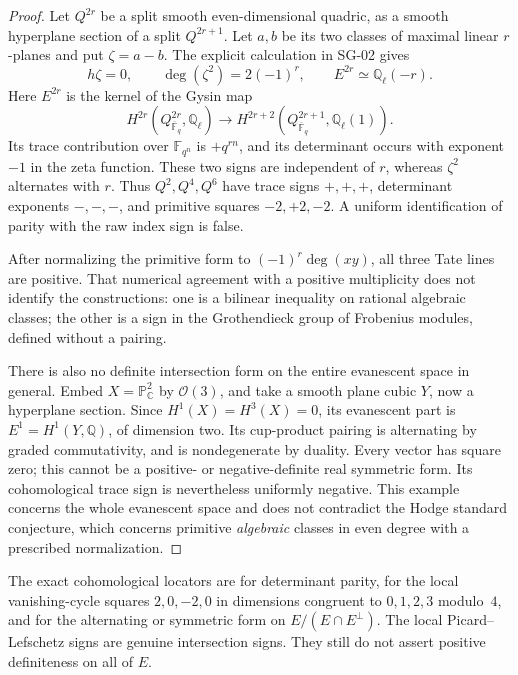 \begin{proof}
Let $Q^{2r}$ be a split smooth even-dimensional quadric, as a smooth hyperplane section of a split $Q^{2r+1}$. Let $a,b$ be its two classes of maximal linear $r$-planes and put $\zeta=a-b$. The explicit calculation in SG-02 gives
\[
 h\zeta=0,\qquad \deg(\zeta^2)=2(-1)^r,
 \qquad E^{2r}\simeq\mathbb Q_\ell(-r).
\]
Here $E^{2r}$ is the kernel of the Gysin map
\[
 H^{2r}(Q^{2r}_{\overline{\mathbb F}_q},\mathbb Q_\ell)
 \longrightarrow H^{2r+2}(Q^{2r+1}_{\overline{\mathbb F}_q},\mathbb Q_\ell(1)).
\]
Its trace contribution over $\mathbb F_{q^n}$ is $+q^{rn}$, and its determinant occurs with exponent $-1$ in the zeta function. These two signs are independent of $r$, whereas $\zeta^2$ alternates with $r$. Thus $Q^2,Q^4,Q^6$ have trace signs $+,+,+$, determinant exponents $-,-,-$, and primitive squares $-2,+2,-2$. A uniform identification of parity with the raw index sign is false.

After normalizing the primitive form to $(-1)^r\deg(xy)$, all three Tate lines are positive. That numerical agreement with a positive multiplicity does not identify the constructions: one is a bilinear inequality on rational algebraic classes; the other is a sign in the Grothendieck group of Frobenius modules, defined without a pairing.

There is also no definite intersection form on the entire evanescent space in general. Embed $X=\mathbb P^2_{\mathbb C}$ by $\mathcal O(3)$, and take a smooth plane cubic $Y$, now a hyperplane section. Since $H^1(X)=H^3(X)=0$, its evanescent part is $E^1=H^1(Y,\mathbb Q)$, of dimension two. Its cup-product pairing is alternating by graded commutativity, and is nondegenerate by duality. Every vector has square zero; this cannot be a positive- or negative-definite real symmetric form. Its cohomological trace sign is nevertheless uniformly negative. This example concerns the whole evanescent space and does not contradict the Hodge standard conjecture, which concerns primitive \emph{algebraic} classes in even degree with a prescribed normalization.
\end{proof}

The exact cohomological locators are \cite[eq.~(1.5.4), p.~276]{WeilI} for determinant parity, \cite[\S4.1, p.~287]{WeilI} for the local vanishing-cycle squares $2,0,-2,0$ in dimensions congruent to $0,1,2,3$ modulo~$4$, and \cite[\S5.9, p.~293]{WeilI} for the alternating or symmetric form on $E/(E\cap E^\perp)$. The local Picard--Lefschetz signs are genuine intersection signs. They still do not assert positive definiteness on all of $E$.


